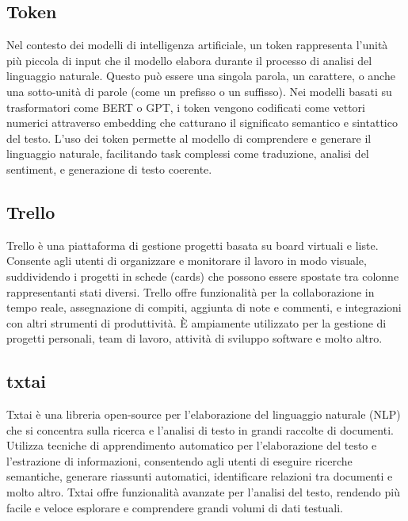\vspace{2em}
\subsection*{Token}
\par Nel contesto dei modelli di intelligenza artificiale, un token rappresenta l'unità più piccola di input che il modello elabora durante il processo di analisi del linguaggio naturale. Questo può essere una singola parola, un carattere, o anche una sotto-unità di parole (come un prefisso o un suffisso). Nei modelli basati su trasformatori come BERT o GPT, i token vengono codificati come vettori numerici attraverso embedding che catturano il significato semantico e sintattico del testo. L'uso dei token permette al modello di comprendere e generare il linguaggio naturale, facilitando task complessi come traduzione, analisi del sentiment, e generazione di testo coerente.

\vspace{2em}
\subsection*{Trello}
\par Trello è una piattaforma di gestione progetti basata su board virtuali e liste. Consente agli utenti di organizzare e monitorare il lavoro in modo visuale, suddividendo i progetti in schede (cards) che possono essere spostate tra colonne rappresentanti stati diversi. Trello offre funzionalità per la collaborazione in tempo reale, assegnazione di compiti, aggiunta di note e commenti, e integrazioni con altri strumenti di produttività. È ampiamente utilizzato per la gestione di progetti personali, team di lavoro, attività di sviluppo software e molto altro.

\vspace{2em}
\subsection*{txtai}
\par Txtai è una libreria open-source per l'elaborazione del linguaggio naturale (NLP) che si concentra sulla ricerca e l'analisi di testo in grandi raccolte di documenti. Utilizza tecniche di apprendimento automatico per l'elaborazione del testo e l'estrazione di informazioni, consentendo agli utenti di eseguire ricerche semantiche, generare riassunti automatici, identificare relazioni tra documenti e molto altro. Txtai offre funzionalità avanzate per l'analisi del testo, rendendo più facile e veloce esplorare e comprendere grandi volumi di dati testuali.
